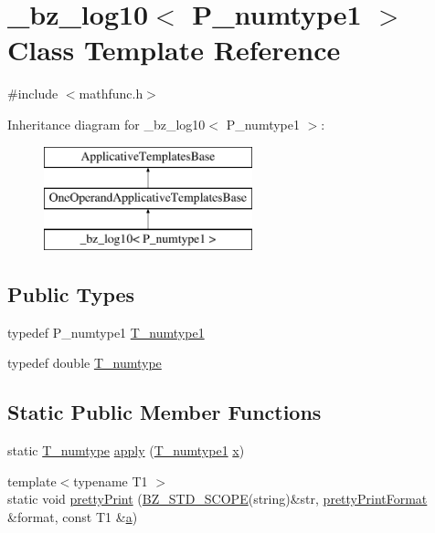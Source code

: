 \hypertarget{class__bz__log10}{}\section{\+\_\+bz\+\_\+log10$<$ P\+\_\+numtype1 $>$ Class Template Reference}
\label{class__bz__log10}


{\ttfamily \#include $<$mathfunc.\+h$>$}

Inheritance diagram for \+\_\+bz\+\_\+log10$<$ P\+\_\+numtype1 $>$\+:\begin{figure}[H]
\begin{center}
\leavevmode
\includegraphics[height=3.000000cm]{class__bz__log10}
\end{center}
\end{figure}
\subsection*{Public Types}
\begin{DoxyCompactItemize}
\item 
typedef P\+\_\+numtype1 \hyperlink{class__bz__log10_a27c4079c0585553f6d9cd18d21e42228}{T\+\_\+numtype1}
\item 
typedef double \hyperlink{class__bz__log10_a05c2179ec15eb279a3100ad4e5f8bd9d}{T\+\_\+numtype}
\end{DoxyCompactItemize}
\subsection*{Static Public Member Functions}
\begin{DoxyCompactItemize}
\item 
static \hyperlink{class__bz__log10_a05c2179ec15eb279a3100ad4e5f8bd9d}{T\+\_\+numtype} \hyperlink{class__bz__log10_a9dc15a58d51abb11ae5641578580c0a1}{apply} (\hyperlink{class__bz__log10_a27c4079c0585553f6d9cd18d21e42228}{T\+\_\+numtype1} \hyperlink{vecnorm1_8cc_ac73eed9e41ec09d58f112f06c2d6cb63}{x})
\item 
{\footnotesize template$<$typename T1 $>$ }\\static void \hyperlink{class__bz__log10_aa8064201d2c3a36f20607df611b5b5e9}{pretty\+Print} (\hyperlink{numinquire_8h_a2b24ffc3b4ef9803956bc7715c6c7b83}{B\+Z\+\_\+\+S\+T\+D\+\_\+\+S\+C\+O\+P\+E}(string)\&str, \hyperlink{classprettyPrintFormat}{pretty\+Print\+Format} \&format, const T1 \&\hyperlink{gen__mat5files_8m_aae328bf20413f220e38aec4d95bfd6da}{a})
\end{DoxyCompactItemize}


